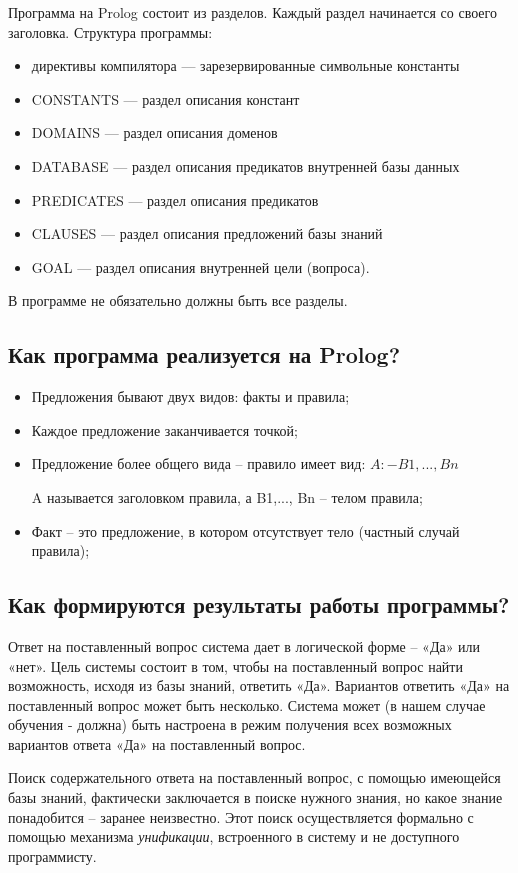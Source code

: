 \documentclass[a4paper,12pt]{article}
\begin{document}
	Программа на Prolog состоит из разделов. Каждый раздел начинается со своего заголовка. Структура программы:
	\begin{itemize}
		\item директивы компилятора — зарезервированные символьные константы
	    \item CONSTANTS — раздел описания констант
	    \item DOMAINS — раздел описания доменов
	    \item DATABASE — раздел описания предикатов внутренней базы данных
	    \item PREDICATES — раздел описания предикатов
	    \item CLAUSES — раздел описания предложений базы знаний
	    \item GOAL — раздел описания внутренней цели (вопроса).
	\end{itemize}
	В программе не обязательно должны быть все разделы.
	
	
	\subsection{Как программа реализуется на Prolog?}
	
	\begin{itemize}
		\item Предложения бывают двух видов: факты и правила;
		\item Каждое предложение заканчивается точкой;
		\item Предложение более общего вида – правило имеет вид:
$A :- B1,... , Bn$
		
		A называется заголовком правила, а B1,..., Bn – телом правила;
		\item Факт – это предложение, в котором отсутствует тело (частный случай правила);
	\end{itemize}
	
	
	\subsection{Как формируются результаты работы программы?}
	
	Ответ на поставленный вопрос система дает в логической форме – «Да» или «нет». Цель системы состоит в том, чтобы на поставленный вопрос найти возможность, исходя из базы знаний, ответить «Да». Вариантов ответить «Да» на поставленный вопрос может быть несколько. Система может (в нашем случае обучения - должна) быть  настроена в режим получения всех возможных вариантов ответа «Да» на поставленный вопрос.
	
	Поиск содержательного ответа на поставленный вопрос, с помощью имеющейся базы знаний, фактически заключается в поиске нужного знания, но какое знание понадобится – заранее неизвестно. Этот поиск осуществляется формально с помощью механизма \textit{унификации}, встроенного в систему и не доступного программисту. 
	
\end{document}
